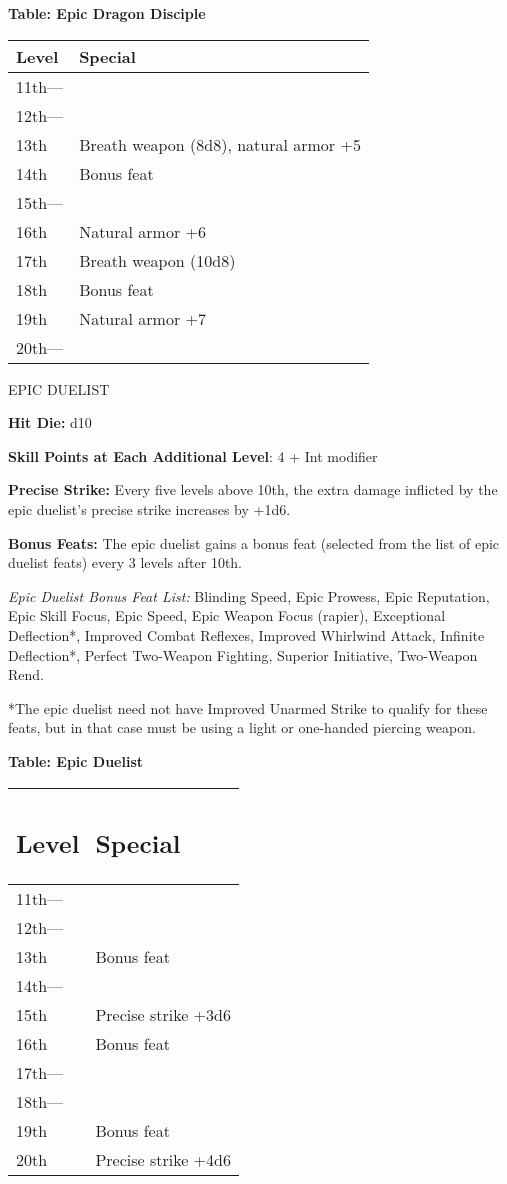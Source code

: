 \documentclass{article}
\begin{document}
\textbf{Table: Epic Dragon Disciple}

\begin{tabular}{|>{\raggedright}p{27pt}|>{\raggedright}p{160pt}|}
\hline
L\textbf{evel} & S\textbf{pecial}\tabularnewline
\hline
11th--- & \tabularnewline
\hline
12th--- & \tabularnewline
\hline
13th & Breath weapon (8d8), natural armor +5\tabularnewline
\hline
14th & Bonus feat\tabularnewline
\hline
15th--- & \tabularnewline
\hline
16th & Natural armor +6\tabularnewline
\hline
17th & Breath weapon (10d8)\tabularnewline
\hline
18th &  Bonus feat\tabularnewline
\hline
19th &  Natural armor +7\tabularnewline
\hline
20th--- & \tabularnewline
\hline
\end{tabular}

\vspace{12pt}
{\LARGE{}EPIC DUELIST}

\textbf{Hit Die: }d10

\textbf{Skill Points at Each Additional Level}: 4 + Int modifier

\textbf{Precise Strike: }Every five levels above 10th, the extra damage inflicted 
by the epic duelist's precise strike increases by +1d6.

\textbf{Bonus Feats: }The epic duelist gains a bonus feat (selected from the list 
of epic duelist feats) every 3 levels after 10th.

\textit{Epic Duelist Bonus Feat List: }Blinding Speed, Epic Prowess, Epic Reputation, 
Epic Skill Focus, Epic Speed, Epic Weapon Focus (rapier), Exceptional Deflection*, 
Improved Combat Reflexes, Improved Whirlwind Attack, Infinite Deflection*, Perfect 
Two-Weapon Fighting, Superior Initiative, Two-Weapon Rend.

*The epic duelist need not have Improved Unarmed Strike to qualify for these feats, 
but in that case must be using a light or one-handed piercing weapon.

\textbf{Table: Epic Duelist}

\begin{tabular}{|>{\raggedright}p{27pt}|>{\raggedright}p{80pt}|}
\hline
\subsection*{L\textbf{evel}} & \subsection*{S\textbf{pecial}}\tabularnewline
\hline
11th--- & \tabularnewline
\hline
12th--- & \tabularnewline
\hline
13th  & Bonus feat\tabularnewline
\hline
14th--- & \tabularnewline
\hline
15th  & Precise strike +3d6\tabularnewline
\hline
16th  & Bonus feat\tabularnewline
\hline
17th--- & \tabularnewline
\hline
18th--- & \tabularnewline
\hline
19th  & Bonus feat\tabularnewline
\hline
20th  & Precise strike +4d6\tabularnewline
\hline
\end{tabular}
\end{document}
